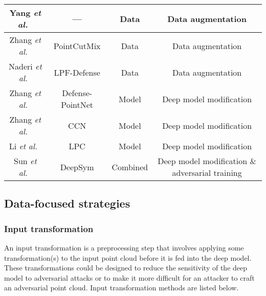\documentclass{ieeeaccess}
\def\etal{\textit{et al.}}
\begin{document}
\begin{table*}
\begin{tabular}{c c | c c}
\multirow{1}{*}{Yang \etal~\cite{yang2019adversarial}} & --- & Data & Data augmentation \\ 
\hline

\multirow{1}{*}{Zhang \etal~\cite{zhang2022pointcutmix}} & PointCutMix & Data & Data augmentation \\ 
\hline

\multirow{1}{*}{Naderi \etal~\cite{naderi2023lpf}} & LPF-Defense & Data & Data augmentation \\ 
\hline


\multirow{1}{*}{Zhang \etal~\cite{zhang2019defense}} & Defense-PointNet & Model & Deep model modification \\ 
\hline


\multirow{1}{*}{Zhang \etal~\cite{zhang2019defense}} & CCN & Model & Deep model modification \\ 
\hline


\multirow{1}{*}{Li \etal~\cite{li2022robust}} & LPC & Model & Deep model modification \\ 
\hline

\multirow{1}{*}{Sun \etal~\cite{sun2020adversarial}} & DeepSym & Combined & Deep model modification \& adversarial training \\ 

\bottomrule

\end{tabular}
\end{table*}


\subsection{Data-focused strategies}

\subsubsection{Input transformation}
\label{sec:Input transformation}

An input transformation is a preprocessing %
step that involves applying some transformation(s) to the input point cloud before it is fed into the deep model. These transformations could be designed to reduce the sensitivity of the deep model to adversarial attacks or to make it more difficult for an attacker to craft an adversarial point cloud. Input transformation methods are listed below.
\end{document}
